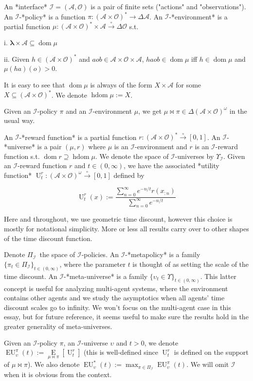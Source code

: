 \documentclass[a4paper]{article}
\DeclareMathOperator{\Dom}{dom}
\newcommand{\E}[1]{\underset{#1}{\operatorname{E}}}
\newcommand{\Estr}{\boldsymbol{\lambda}}
\newcommand{\PF}{\xrightarrow{\circ}}
\newcommand{\Ob}{\mathcal{O}}
\newcommand{\A}{\mathcal{A}}
\newcommand{\I}{\mathcal{I}}
\newcommand{\FH}{(\A \times \Ob)^*}
\newcommand{\IH}{(\A \times \Ob)^\omega}
\DeclareMathOperator{\HD}{hdom}
\newcommand{\Ut}{\operatorname{U}}
\newcommand{\EU}{\operatorname{EU}}
\begin{document}
An *interface* $\I = (\A,\Ob)$ is a pair of finite sets  ("actions" and "observations"). An $\I$-*policy* is a function $\pi: \FH \rightarrow \Delta\A$. An $\I$-*environment* is a partial function $\mu: \FH \times \A \PF \Delta\Ob$ s.t. 

i. $\Estr \times \A \subseteq \Dom \mu$

ii. Given $h \in \FH$ and $aob \in \A \times \Ob \times \A$, $haob \in \Dom \mu$ iff $h \in \Dom \mu$ and $\mu(ha)(o) > 0$.

It is easy to see that $\Dom \mu$ is always of the form $X \times \A$ for some $X \subseteq \FH$. We denote $\HD \mu := X$.

Given an $\I$-policy $\pi$ and an $\I$-environment $\mu$, we get $\mu\bowtie\pi \in \Delta\IH$ in the usual way.

An $\I$-*reward function* is a partial function $r: (\A \times \Ob)^* \PF [0,1]$. An $\I$-*universe* is a pair $(\mu,r)$ where $\mu$ is an $\I$-environment and $r$ is an $\I$-reward function s.t. $\Dom{r} \supseteq \HD{\mu}$. We denote the space of $\I$-universes by $\Upsilon_\I$. Given an $\I$-reward function $r$ and $t \in (0,\infty)$, we have the associated *utility function* $\Ut_t^r: \IH \PF [0,1]$ defined by

$$\Ut_t^{r}(x):=\frac{\sum_{n=0}^\infty e^{-n/t} r(x_{:n})}{\sum_{n=0}^\infty e^{-n/t}}$$

Here and throughout, we use geometric time discount, however this choice is mostly for notational simplicity. More or less all results carry over to other shapes of the time discount function.

Denote $\Pi_{\I}$\ the space of $\I$-policies. An $\I$-*metapolicy* is a family $\{\pi_t \in \Pi_\I\}_{t \in (0, \infty)}$, where the parameter $t$ is thought of as setting the scale of the time discount. An $\I$-*meta-universe* is a family $\{\upsilon_t \in \Upsilon\}_{t \in (0, \infty)}$. This latter concept is useful for analyzing multi-agent systems, where the environment contains other agents and we study the asymptotics when all agents' time discount scales go to infinity. We won't focus on the multi-agent case in this essay, but for future reference, it seems useful to make sure the results hold in the greater generality of meta-universes.

Given an $\I$-policy $\pi$, an $\I$-universe $\upsilon$ and $t > 0$, we denote $\EU_\upsilon^\pi(t):=\E{\mu\bowtie\pi}[\Ut^r_t]$ (this is well-defined since $\Ut^r_t$ is defined on the support of $\mu\bowtie\pi$). We also denote  $\EU_\upsilon^*(t):=\max_{\pi \in \Pi_\I} \EU_\upsilon^\pi(t)$. We will omit $\I$ when it is obvious from the context.
\end{document}
